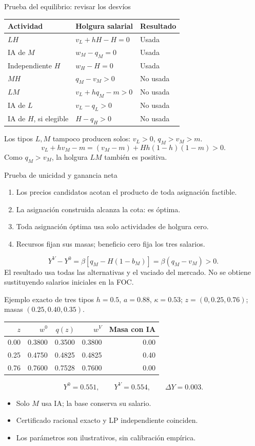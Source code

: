 \documentclass[aspectratio=169,11pt]{beamer}
\begin{document}
\begin{frame}{Prueba del equilibrio: revisar los desvíos}
\small
\begin{tabular}{lll}\toprule
Actividad & Holgura salarial & Resultado\\\midrule
$LH$ & $v_L+hH-H=0$ & Usada\\
IA de $M$ & $w_M-q_M=0$ & Usada\\
Independiente $H$ & $w_H-H=0$ & Usada\\
$MH$ & $q_M-v_M>0$ & No usada\\
$LM$ & $v_L+hq_M-m>0$ & No usada\\
IA de $L$ & $v_L-q_L>0$ & No usada\\
IA de $H$, si elegible & $H-q_H>0$ & No usada\\\bottomrule
\end{tabular}\par
\medskip
Los tipos $L,M$ tampoco producen solos: $v_L>0$, $q_M>v_M>m$.
\[
v_L+hv_M-m=(v_M-m)+Hh(1-h)(1-m)>0.
\]
Como $q_M>v_M$, la holgura $LM$ también es positiva.
\end{frame}
\begin{frame}{Prueba de unicidad y ganancia neta}
\begin{enumerate}
\item Los precios candidatos acotan el producto de toda asignación factible.
\item La asignación construida alcanza la cota: es óptima.
\item Toda asignación óptima usa solo actividades de holgura cero.
\item Recursos fijan sus masas; beneficio cero fija los tres salarios.
\end{enumerate}
\medskip
\[
Y^V-Y^0=\beta[q_M-H(1-b_M)]
=\beta(q_M-v_M)>0.
\]
El resultado usa todas las alternativas y el vaciado del mercado. No se obtiene sustituyendo salarios iniciales en la FOC.
\end{frame}
\begin{frame}{Ejemplo exacto de tres tipos}
\small
$h=0.5$, $a=0.88$, $\kappa=0.53$; $z=(0,0.25,0.76)$; masas $(0.25,0.40,0.35)$.
\begin{center}
\begin{tabular}{rrrrr}\toprule
$z$ & $w^0$ & $q(z)$ & $w^V$ & Masa con IA\\\midrule
0.00&0.3800&0.3500&0.3800&0.00\\
0.25&0.4750&0.4825&0.4825&0.40\\
0.76&0.7600&0.7528&0.7600&0.00\\\bottomrule
\end{tabular}
\end{center}
\[
Y^0=0.551,\qquad Y^V=0.554,\qquad\Delta Y=0.003.
\]
\begin{itemize}
\item Solo $M$ usa IA; la base conserva su salario.
\item Certificado racional exacto y LP independiente coinciden.
\item Los parámetros son ilustrativos, sin calibración empírica.
\end{itemize}
\end{frame}
\end{document}
